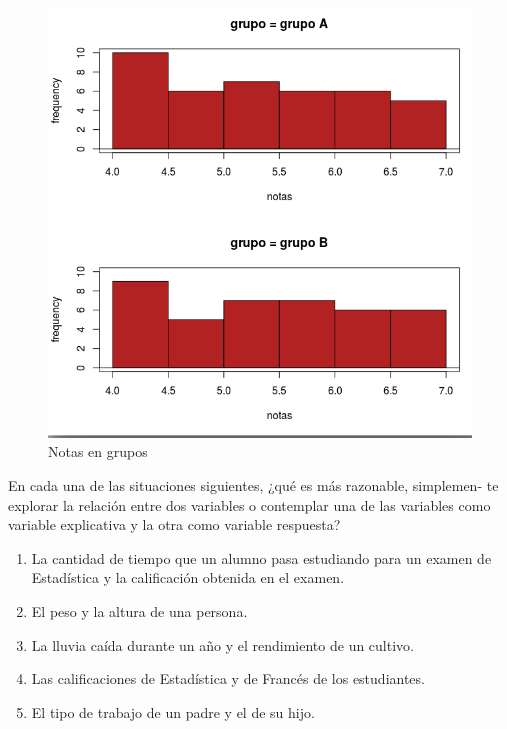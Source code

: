 \documentclass[11pt,evaluacion]{uescimat}
\begin{document}
\begin{problema}
\begin{figure}[H]
\begin{centering}
\includegraphics[scale=0.30]{imagen8.png}
\par\end{centering}
\caption{Notas en grupos}
\end{figure}


\end{problema}


\begin{problema}
En cada una de las situaciones siguientes, ¿qué es más razonable, simplemen-
te explorar la relación entre dos variables o contemplar una de las variables como
variable explicativa y la otra como variable respuesta?

\begin{enumerate}[label=(\alph*)]
\item La cantidad de tiempo que un alumno pasa estudiando para un examen
de Estadística y la calificación obtenida en el examen.
\item El peso y la altura de una persona.
\item La lluvia caída durante un año y el rendimiento de un cultivo.
\item Las calificaciones de Estadística y de Francés de los estudiantes.
\item El tipo de trabajo de un padre y el de su hijo.
\end{enumerate}



\end{problema}
\end{document}
